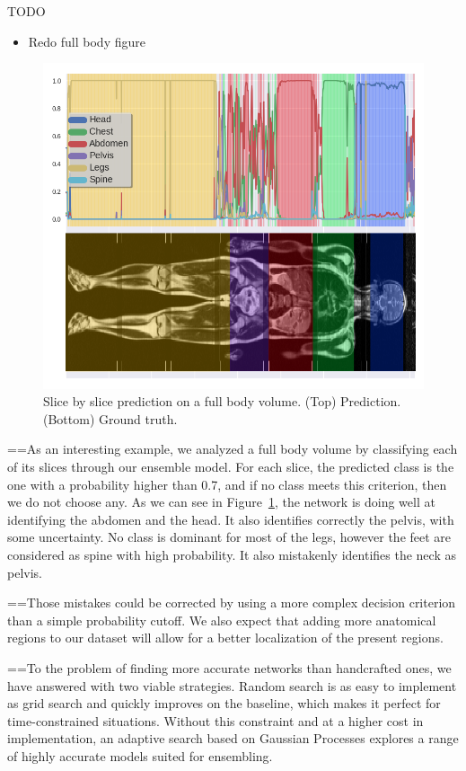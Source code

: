 TODO
\begin{itemize}
    \item Redo full body figure
\end{itemize}

\begin{figure}[htb]
	\centering
	\includegraphics[width=.95\linewidth]{img_hyperopt/full_body_updated}
	\caption{Slice by slice prediction on a full body volume. (Top) Prediction. (Bottom) Ground truth.}
	\label{fig:full_body}
\end{figure}

==As an interesting example, we analyzed a full body volume by classifying each of its slices through our ensemble model. For each slice, the predicted class is the one with a probability higher than 0.7, and if no class meets this criterion, then we do not choose any. As we can see in Figure~\ref{fig:full_body}, the network is doing well at identifying the abdomen and the head. It also identifies correctly the pelvis, with some uncertainty. No class is dominant for most of the legs, however the feet are considered as spine with high probability. It also mistakenly identifies the neck as pelvis.

==Those mistakes could be corrected by using a more complex decision criterion than a simple probability cutoff. We also expect that adding more anatomical regions to our dataset will allow for a better localization of the present regions.

==To the problem of finding more accurate networks than handcrafted ones, we have answered with two viable strategies. Random search is as easy to implement as grid search and quickly improves on the baseline, which makes it perfect for time-constrained situations. Without this constraint and at a higher cost in implementation, an adaptive search based on Gaussian Processes explores a range of highly accurate models suited for ensembling.%

